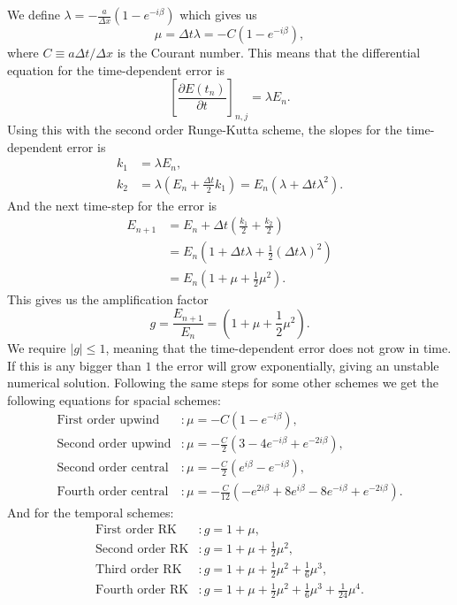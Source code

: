 We define $\lambda= - \frac{a}{\Delta x}\left( 1-e^{-i\beta} \right)$ which gives us 
\begin{equation}
    \mu = \Delta t \lambda = - C\left( 1-e^{-i\beta} \right),
\end{equation}
where $C\equiv a\Delta t/\Delta x$ is the Courant number. This means that the differential equation for the time-dependent error is
\begin{equation}
    \left[\frac{\partial E(t_n)}{\partial t}\right]_{n,j} = \lambda E_n.
\end{equation}
Using this with the second order Runge-Kutta scheme, the slopes for the time-dependent error is
\begin{align*}
    k_1 &= \lambda E_n,\\
    k_2 &= \lambda \left(E_n+\frac{\Delta t}{2}k_1 \right) = E_n \left( \lambda + \Delta t \lambda^2 \right).
\end{align*}
And the next time-step for the error is
\begin{align*}
    E_{n+1} &= E_n + \Delta t \left( \frac{k_1}{2} +\frac{k_2}{2} \right)\\
    &= E_n \left( 1 +\Delta t \lambda + \frac{1}{2}\left( \Delta t\lambda \right)^2 \right)\\
    & = E_n \left( 1 + \mu + \frac{1}{2}\mu^2  \right).
\end{align*}
This gives us the amplification factor 
\begin{equation}
    g = \frac{E_{n+1}}{E_n} = \left( 1 + \mu + \frac{1}{2}\mu^2  \right).
\end{equation}
We require $|g|\leq 1$, meaning that the time-dependent error does not grow in time. If this is any bigger than $1$ the error will grow exponentially, giving an unstable numerical solution. Following the same steps for some other schemes we get the following equations for spacial schemes:
\begin{align*}
    \text{First order upwind} &: \mu=-C\left(1-e^{-i\beta}\right),\\
    \text{Second order upwind} &: \mu=-\frac{C}{2}\left(3-4e^{-i\beta}+e^{-2i\beta}\right),\\
    \text{Second order central} &: \mu = -\frac{C}{2}\left(e^{i\beta} - e^{-i\beta}\right),\\
    \text{Fourth order central} &: \mu = - \frac{C}{12}\left(-e^{2i\beta}+8e^{i\beta}-8e^{-i\beta}+e^{-2i\beta}\right).
\end{align*}
And for the temporal schemes:
\begin{align*}
    \text{First order RK} &: g = 1+\mu,\\
    \text{Second order RK} &: g = 1+\mu + \frac{1}{2}\mu^2,\\
    \text{Third order RK} &: g = 1+\mu + \frac{1}{2}\mu^2+\frac{1}{6}\mu^3,\\
    \text{Fourth order RK} &: g = 1+\mu + \frac{1}{2}\mu^2+\frac{1}{6}\mu^3+\frac{1}{24}\mu^4.
\end{align*}
